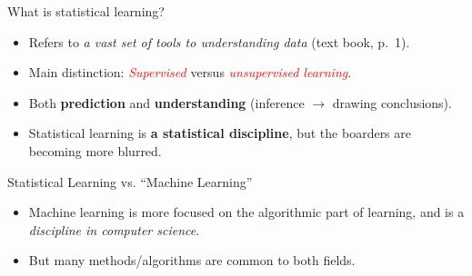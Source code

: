 \documentclass[10pt,ignorenonframetext,]{beamer}
\providecommand{\tightlist}{%
  \setlength{\itemsep}{0pt}\setlength{\parskip}{0pt}}
\begin{document}
\begin{frame}{What is statistical learning?}

\begin{itemize}
\tightlist
\item
  Refers to \emph{a vast set of tools to understanding data} (text book,
  p.~1).
\end{itemize}

\vspace{1mm}

\begin{itemize}
\tightlist
\item
  Main distinction: \emph{\textcolor{red}{Supervised}} versus
  \emph{\textcolor{red}{unsupervised learning}}.
\end{itemize}

\vspace{1mm}

\begin{itemize}
\tightlist
\item
  Both \textbf{prediction} and \textbf{understanding} (inference
  \(\rightarrow\) drawing conclusions).
\end{itemize}

\vspace{1mm}

\begin{itemize}
\tightlist
\item
  Statistical learning is \textbf{a statistical discipline}, but the
  boarders are becoming more blurred.
\end{itemize}

\end{frame}

\begin{frame}{Statistical Learning vs. ``Machine Learning''}

\vspace{2mm}

\begin{itemize}
\tightlist
\item
  Machine learning is more focused on the algorithmic part of learning,
  and is a \emph{discipline in computer science}.
\end{itemize}

\vspace{2mm}

\begin{itemize}
\tightlist
\item
  But many methods/algorithms are common to both fields.
\end{itemize}

\end{frame}
\end{document}

